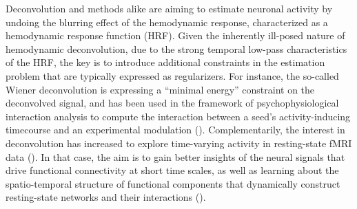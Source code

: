 Deconvolution and methods alike are aiming to estimate neuronal activity by undoing the blurring effect of the hemodynamic response, characterized as a hemodynamic response function (HRF). Given the inherently ill-posed nature of hemodynamic deconvolution, due to the strong temporal low-pass characteristics of the HRF, the key is to introduce additional constraints in the estimation problem that are typically expressed as regularizers. For instance, the so-called Wiener deconvolution is expressing a ``minimal energy'' constraint on the deconvolved signal, and has been used in the framework of psychophysiological interaction analysis to compute the interaction between a seed's activity-inducing timecourse and an experimental modulation (\citealt{Glover1999DeconvolutionImpulseResponse,Gitelman2003Modelingregionalpsychophysiologic,Gerchen2014Analyzingtaskdependent,Di2018TaskConnectomicsExamining,Freitas2020Timeresolvedeffective}). Complementarily, the interest in deconvolution has increased to explore time-varying activity in resting-state fMRI data (\citealt{Preti2017dynamicfunctionalconnectome,Keilholz2017TimeResolvedResting,Lurie2020Questionscontroversiesstudy,Bolton2020TappingMultiFaceted}). In that case, the aim is to gain better insights of the neural signals that drive functional connectivity at short time scales, as well as learning about the spatio-temporal structure of functional components that dynamically construct resting-state networks and their interactions (\citealt{Karahanoglu2017Dynamicslargescale}).

